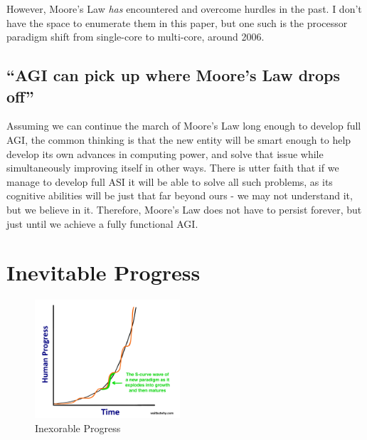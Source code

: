 \documentclass[12pt]{article} %
\begin{document}
However, Moore's Law \textit{has} encountered and overcome hurdles in the past\cite{hurdle}\cite{speeds}. I don't have the space to enumerate them in this paper, but one such is the processor paradigm shift from single-core to multi-core, around 2006.


\subsection{``AGI can pick up where Moore's Law drops off''} %

Assuming we can continue the march of Moore's Law long enough to develop full AGI, the common thinking is that the new entity will be smart enough to help develop its own advances in computing power\cite{wbw}, and solve that issue while simultaneously improving itself in other ways. There is utter faith that if we manage to develop full ASI it will be able to solve all such problems, as its cognitive abilities will be just that far beyond ours - we may not understand it, but we believe in it. Therefore, Moore's Law does not have to persist forever, but just until we achieve a fully functional AGI.


\section{Inevitable Progress} %

\begin{figure}
  \begin{center}
    \includegraphics[width=0.48\textwidth]{curvyexponential.png}
  \end{center}
  \caption{Inexorable Progress}
\end{figure}
\end{document}
